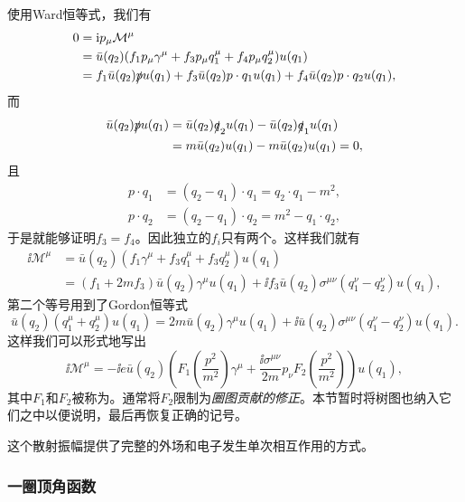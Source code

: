 使用Ward恒等式，我们有
\[
    \begin{aligned}
        0 &= \mathrm{i} p_\mu \mathcal{M}^\mu \\
        &= \bar{u}(q_2) (f_1 p_\mu \gamma^\mu + f_3 p_\mu q_1^\mu + f_4 p_\mu q_2^\mu) u(q_1) \\
        &= f_1 \bar{u}(q_2) \slashed{p} u(q_1) + f_3 \bar{u}(q_2) p \cdot q_1 {u}(q_1) + f_4 \bar{u}(q_2) p \cdot q_2 u(q_1),
    \end{aligned}
\]
而
\[
    \begin{aligned}
        \bar{u}(q_2) \slashed{p} u(q_1) &= \bar{u}(q_2) \slashed{q}_2 u(q_1) - \bar{u}(q_2) \slashed{q}_1 u(q_1) \\
        &= m \bar{u}(q_2) u(q_1) - m \bar{u}(q_2) u(q_1) = 0,
    \end{aligned}
\]
且
\[
    \begin{aligned}
        p \cdot q_1 &= (q_2 - q_1) \cdot q_1 = q_2 \cdot q_1 - m^2, \\
        p \cdot q_2 &= (q_2 - q_1) \cdot q_2 = m^2 - q_1 \cdot q_2,
    \end{aligned}
\]
于是就能够证明$f_3=f_4$。因此独立的$f_i$只有两个。这样我们就有
\[
    \begin{aligned}
        \ii \mathcal{M}^\mu &= \bar{u}(q_2) (f_1 \gamma^\mu + f_3 q_1^\mu + f_3 q_2^\mu) u(q_1) \\
        &= (f_1 + 2m f_3) \bar{u}(q_2) \gamma^\mu u(q_1) + \ii f_3 \bar{u}(q_2) \sigma^{\mu \nu} (q_1^\nu - q_2^\nu) u(q_1), 
    \end{aligned}
\]
第二个等号用到了Gordon恒等式
\[
    \bar{u}(q_2) (q_1^\mu + q_2^\mu) u(q_1) = 2m \bar{u}(q_2) \gamma^\mu u(q_1) + \ii \bar{u}(q_2) \sigma^{\mu \nu} (q_1^\nu - q_2^\nu) u(q_1).
\]
这样我们可以形式地写出
\begin{equation}
    \ii \mathcal{M}^\mu = -\ii e \bar{u}(q_2) \left( F_1\left(\frac{p^2}{m^2}\right) \gamma^\mu + \frac{\ii \sigma^{\mu \nu}}{2m} p_\nu F_2\left(\frac{p^2}{m^2}\right) \right) u(q_1),
    \label{eq:form-factor-vertex}
\end{equation}
其中$F_1$和$F_2$被称为。通常将$F_2$限制为\emph{圈图贡献的修正}。本节暂时将树图也纳入它们之中以便说明，最后再恢复正确的记号。

这个散射振幅提供了完整的外场和电子发生单次相互作用的方式。

\subsubsection{一圈顶角函数}

